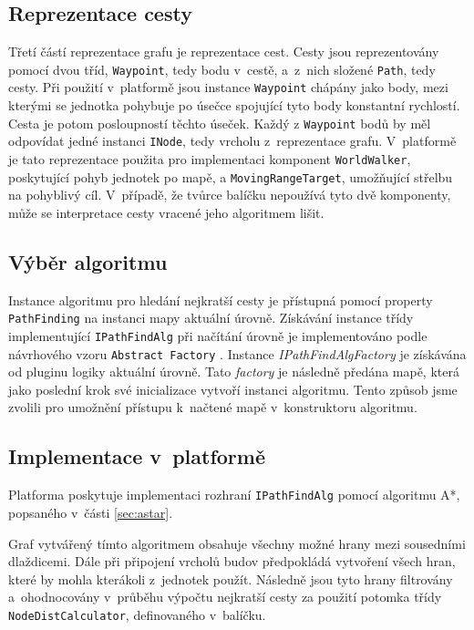\subsection{Reprezentace cesty}
\label{sec:path}
Třetí částí reprezentace grafu je reprezentace cest. Cesty jsou reprezentovány pomocí dvou tříd, \texttt{Waypoint}, tedy bodu v~cestě, a~z~nich složené \texttt{Path}, tedy cesty. Při použití v~platformě jsou instance \texttt{Waypoint} chápány jako body, mezi kterými se jednotka pohybuje po úsečce spojující tyto body konstantní rychlostí. Cesta je potom posloupností těchto úseček. Každý z \texttt{Waypoint} bodů by měl odpovídat jedné instanci \texttt{INode}, tedy vrcholu z~reprezentace grafu. V~platformě je tato reprezentace použita pro implementaci komponent \texttt{WorldWalker}, poskytující pohyb jednotek po mapě, a \texttt{MovingRangeTarget}, umožňující střelbu na pohyblivý cíl. V~případě, že tvůrce balíčku nepoužívá tyto dvě komponenty, může se interpretace cesty vracené jeho algoritmem lišit.


\subsection{Výběr algoritmu}
\label{sec:pathfindselection}
Instance algoritmu pro hledání nejkratší cesty je přístupná pomocí property \texttt{PathFinding} na instanci mapy aktuální úrovně. Získávání instance třídy implementující \texttt{IPathFindAlg} při načítání úrovně je implementováno podle návrhového vzoru \texttt{Abstract Factory} \citep[str.~87]{book:gangoffour}. Instance \textit{IPathFindAlgFactory} je získávána od pluginu logiky aktuální úrovně. Tato \textit{factory} je následně předána mapě, která jako poslední krok své inicializace vytvoří instanci algoritmu. Tento způsob jsme zvolili pro umožnění přístupu k~načtené mapě v~konstruktoru algoritmu.

\subsection{Implementace v~platformě}
Platforma poskytuje implementaci rozhraní \texttt{IPathFindAlg} pomocí algoritmu A*, popsaného v~části \ref{sec:astar}. 

Graf vytvářený tímto algoritmem obsahuje všechny možné hrany mezi sousedními dlaždicemi. Dále při připojení vrcholů budov předpokládá vytvoření všech hran, které by mohla kterákoli z~jednotek použít. Následně jsou tyto hrany filtrovány a~ohodnocovány v~průběhu výpočtu nejkratší cesty za použití potomka třídy \texttt{NodeDistCalculator}, definovaného v~balíčku. 

